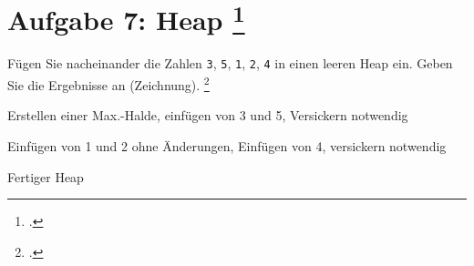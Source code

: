 \documentclass{lehramt-informatik-aufgabe}
\begin{document}

\section{Aufgabe 7: Heap
\footcite[Thema 2 Aufgabe 7]{66115:2012:09}
}

Fügen Sie nacheinander die Zahlen \texttt{3}, \texttt{5}, \texttt{1},
\texttt{2}, \texttt{4} in einen leeren Heap ein. Geben Sie die
Ergebnisse an (Zeichnung).
\footcite[Zeichnen der Heap)]{aud:ab:7}

\begin{minipage}[t][5cm][b]{0.32\linewidth}
Erstellen einer Max.-Halde, einfügen von 3 und 5, Versickern notwendig
\end{minipage}
%
\begin{minipage}[t][5cm][b]{0.32\linewidth}
Einfügen von 1 und 2 ohne Änderungen, Einfügen von 4, versickern notwendig
\end{minipage}
%
\begin{minipage}[t][5cm][b]{0.32\linewidth}
Fertiger Heap
\end{minipage}
\end{document}
